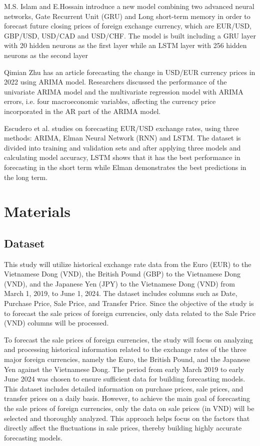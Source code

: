\documentclass{ieeeojies}
\begin{document}
M.S. Islam and E.Hossain \cite{rw3} introduce a new model combining two advanced neural networks, Gate Recurrent Unit (GRU) and Long short-term memory in order to forecast future closing prices of foreign exchange currency, which are EUR/USD, GBP/USD, USD/CAD and USD/CHF. The model is built including a GRU layer with 20 hidden neurons as the first layer while an LSTM layer with 256 hidden neurons as the second layer

Qimian Zhu \cite{rw4} has an article forecasting the change in USD/EUR currency prices in 2022 using ARIMA model. Researchers discussed the performance of the univariate ARIMA model and the multivariate regression model with ARIMA errors, i.e. four macroeconomic variables, affecting the currency price incorporated in the AR part of the ARIMA model.

Escudero et al. \cite{rw5} studies on forecasting EUR/USD exchange rates, using three methods: ARIMA, Elman Neural Network (RNN) and LSTM. The dataset is divided into training and validation sets and after applying three models and calculating model accuracy, LSTM shows that it has the best performance in forecasting in the short term while Elman demonstrates the best predictions in the long term.

\section{Materials}
\subsection{Dataset}
\justify
This study will utilize historical exchange rate data from the Euro (EUR) to the Vietnamese Dong (VND), the British Pound (GBP) to the Vietnamese Dong (VND), and the Japanese Yen (JPY) to the Vietnamese Dong (VND) from March 1, 2019, to June 1, 2024. The dataset includes columns such as Date, Purchase Price, Sale Price, and Transfer Price. Since the objective of the study is to forecast the sale prices of foreign currencies, only data related to the Sale Price (VND) columns will be processed.

To forecast the sale prices of foreign currencies, the study will focus on analyzing and processing historical information related to the exchange rates of the three major foreign currencies, namely the Euro, the British Pound, and the Japanese Yen against the Vietnamese Dong. The period from early March 2019 to early June 2024 was chosen to ensure sufficient data for building forecasting models. This dataset includes detailed information on purchase prices, sale prices, and transfer prices on a daily basis. However, to achieve the main goal of forecasting the sale prices of foreign currencies, only the data on sale prices (in VND) will be selected and thoroughly analyzed. This approach helps focus on the factors that directly affect the fluctuations in sale prices, thereby building highly accurate forecasting models.
\end{document}

